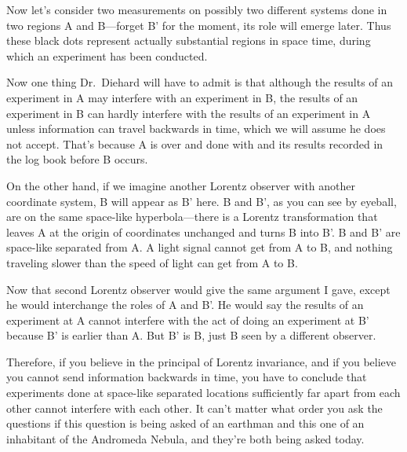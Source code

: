 \documentclass[12pt,nofootinbib]{revtex4}
\begin{document}
Now let's consider two measurements on possibly two different systems done in two regions A and B---forget B' for the moment, its role will emerge later. Thus these black dots represent actually substantial regions in space time, during which an experiment has been conducted.

Now one thing Dr.\ Diehard will have to admit is that although the results of an experiment in A may interfere with an experiment in B, the results of an experiment in B can hardly interfere with the results of an experiment in A unless information can travel backwards in time, which we will assume he does not accept. That's because A is over and done with and its results recorded in the log book before B occurs.

On the other hand, if we imagine another Lorentz observer with another coordinate system, B will appear as B' here. B and B', as you can see by eyeball, are on the same space-like hyperbola---there is a Lorentz transformation that leaves A at the origin of coordinates unchanged and turns B into B'. B and B' are space-like separated from A. A light signal cannot get from A to B, and nothing traveling slower than the speed of light can get from A to B.

Now that second Lorentz observer would give the same argument I gave, except he would interchange the roles of A and B'. He would say the results of an experiment at A cannot interfere with the act of doing an experiment at B' because B' is earlier than A. But B' is B, just B seen by a different observer.

Therefore, if you believe in the principal of Lorentz invariance, and if you believe you cannot send information backwards in time, you have to conclude that experiments done at space-like separated locations sufficiently far apart from each other cannot interfere with each other. It can't matter what order you ask the questions if this question is being asked of an earthman and this one of an inhabitant of the Andromeda Nebula, and they're both being asked today.
\end{document}
